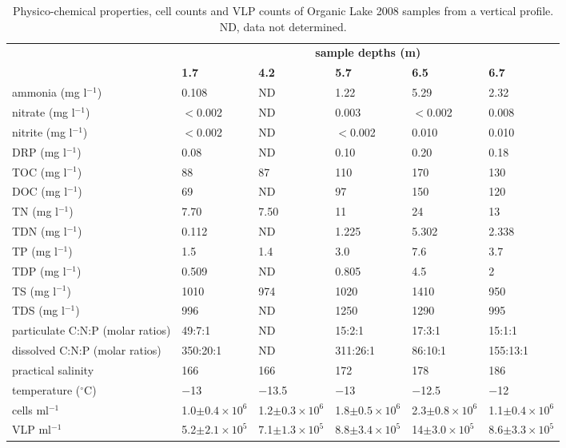 \begin{table}
\footnotesize
\caption[Physico-chemical properties of Organic Lake profile]{Physico-chemical properties, cell counts and \ac{VLP} counts of Organic Lake 2008 samples from a vertical profile. ND, data not determined.}
\label{tab:physico-chem}
\smallskip
\begin{tabularx}{\textwidth}{p{2.6cm}XXXXX}
\toprule
 & \multicolumn{5}{c}{\textbf{sample depths (m)}}\\
 & \textbf{1.7} & \textbf{4.2} & \textbf{5.7} & \textbf{6.5} & \textbf{6.7}\\
\midrule
ammonia (mg l$^{-1}$) & 0.108 & ND & 1.22 & 5.29 & 2.32 \\
nitrate (mg l$^{-1}$) & $<$0.002 & ND & 0.003 & $<$0.002 & 0.008 \\
nitrite (mg l$^{-1}$) & $<$0.002 & ND & $<$0.002 & 0.010 & 0.010 \\
\ac{DRP} (mg l$^{-1}$) & 0.08 & ND & 0.10 & 0.20 & 0.18 \\
\ac{TOC} (mg l$^{-1}$) & 88 & 87 & 110 & 170 & 130 \\
\ac{DOC} (mg l$^{-1}$) & 69 & ND & 97 & 150 & 120 \\
\ac{TN} (mg l$^{-1}$) & 7.70 & 7.50 & 11 & 24 & 13 \\
\ac{TDN} (mg l$^{-1}$) & 0.112 & ND & 1.225 & 5.302 & 2.338 \\
\ac{TP} (mg l$^{-1}$) & 1.5 & 1.4 & 3.0 & 7.6 & 3.7 \\
\ac{TDP} (mg l$^{-1}$) & 0.509 & ND & 0.805 & 4.5 & 2 \\
\ac{TS} (mg l$^{-1}$) & 1010 & 974 & 1020 & 1410 & 950 \\
\ac{TDS} (mg l$^{-1}$) & 996 & ND & 1250 & 1290 & 995 \\
particulate C:N:P (molar ratios) & 49:7:1 & ND & 15:2:1 & 17:3:1 & 15:1:1 \\
dissolved C:N:P (molar ratios) & 350:20:1 & ND & 311:26:1 & 86:10:1 & 155:13:1 \\
practical salinity & 166 & 166 & 172 & 178 & 186 \\
temperature ($^{\circ}$C) & $-$13 & $-$13.5 & $-$13 & $-$12.5 & $-$12 \\
cells ml$^{-1}$ & 1.0$\pm0.4 \times 10^6$ & 1.2$\pm0.3 \times 10^6$ & 1.8$\pm0.5 \times 10^6$ & 2.3$\pm0.8 \times 10^6$ & 1.1$\pm0.4 \times 10^6$ \\
\ac{VLP} ml$^{-1}$ & 5.2$\pm2.1 \times 10^5$ & 7.1$\pm1.3 \times 10^5$ & 8.8$\pm3.4 \times 10^5$ & 14$\pm3.0 \times 10^5$ & 8.6$\pm3.3 \times 10^5$ \\
\bottomrule
\end{tabularx}
\end{table}
